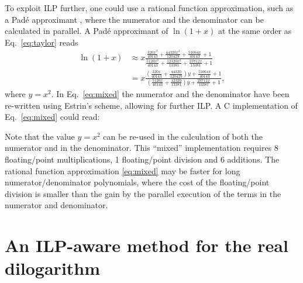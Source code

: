 \documentclass[10pt,DIV16,twocolumn,numbers=noenddot]{scrartcl}
\begin{document}
To exploit ILP further, one could use a rational function
approximation, such as a Padé approximant \cite{pade}, where the
numerator and the denominator can be calculated in parallel.  A Padé
approximant of $\ln(1+x)$ at the same order as Eq.~\eqref{eq:taylor}
reads
%
\begin{align}
  \ln(1+x) &\approx x
  \frac{\frac{320 x^3}{40143}+\frac{44320 x^2}{120429}+\frac{51064
    x}{40143}+1}{\frac{5120 x^3}{40143}+\frac{12320 x^2}{13381}+\frac{23712
    x}{13381}+1}
  \label{eq:pade}
  \\
  &= x
  \frac{\left(\frac{320 x}{40143}+\frac{44320}{120429}\right)y+\frac{51064
    x}{40143}+1}{\left(\frac{5120 x}{40143}+\frac{12320}{13381}\right)y+\frac{23712
    x}{13381}+1},
  \label{eq:mixed}
\end{align}
%
where $y=x^2$.  In Eq.~\eqref{eq:mixed} the numerator and the
denominator have been re-written using Estrin's scheme, allowing for
further ILP.  A C implementation of Eq.~\eqref{eq:mixed} could read:
%

%
Note that the value $y=x^2$ can be re-used in the calculation of both
the numerator and in the denominator.  This ``mixed'' implementation
requires 8 floating\-/point multiplications, 1 floating\-/point
division and 6 additions.  The rational function approximation
\eqref{eq:mixed} may be faster for long numerator/denominator
polynomials, where the cost of the floating\-/point division is
smaller than the gain by the parallel execution of the terms in the
numerator and denominator.


\section{An ILP-aware method for the real dilogarithm}
\label{sec:algorithm}
\end{document}
